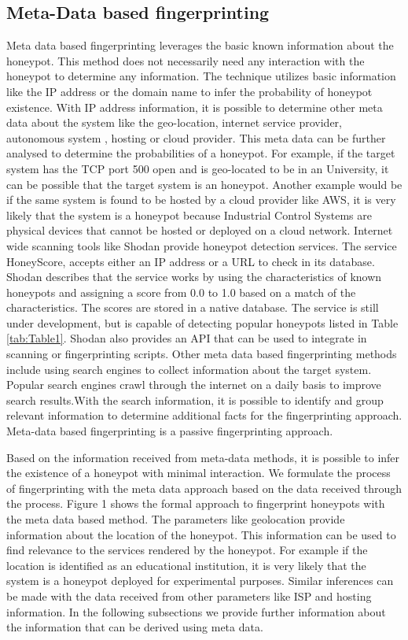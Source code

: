 \documentclass[letterpaper, 10 pt, conference]{ieeeconf}  %
\begin{document}
\subsection{Meta-Data based fingerprinting}
Meta data based fingerprinting leverages the basic known information about the honeypot. This method does not necessarily need any interaction with the honeypot to determine any information. The technique utilizes basic information like the IP address or the domain name to infer the probability of honeypot existence. With IP address information, it is possible to determine other meta data about the system like the geo-location, internet service provider, autonomous system , hosting or cloud provider. This meta data can be further analysed to determine the probabilities of a honeypot. For example, if the target system has the TCP port 500 open and is geo-located to be in an University, it can be possible that the target system is an honeypot. Another example would be if the same system is found to be hosted by a cloud provider like AWS, it is very likely that the system is a honeypot because Industrial Control Systems are physical devices that cannot be hosted or deployed on a cloud network.
Internet wide scanning tools like Shodan provide honeypot detection services. The service HoneyScore, accepts either an IP address or a URL to check in its database. Shodan describes that the service works by using the characteristics of known honeypots and assigning a score from 0.0 to 1.0 based on a match of the characteristics. The scores are stored in a native database. The service is still under development, but is capable of detecting popular honeypots listed in Table \ref{tab:Table1}. Shodan also provides an API that can be used to integrate in scanning or fingerprinting scripts. Other meta data based fingerprinting methods include using search engines to collect information about the target system. Popular search engines crawl through the internet on a daily basis to improve search results.With the search information, it is possible to identify and group relevant information to determine additional facts for the fingerprinting approach. Meta-data based fingerprinting is a passive fingerprinting approach.


Based on the information received from meta-data methods, it is possible to infer the existence of a honeypot with minimal interaction. We formulate the process of fingerprinting with the meta data approach based on the data received through the process. Figure 1 shows the formal approach to fingerprint honeypots with the meta data based method. The parameters like geolocation provide information about the location of the honeypot. This information can be used to find relevance to the services rendered by the honeypot. For example if the location is identified as an educational institution, it is very likely that the system is a honeypot deployed for experimental purposes. Similar inferences can be made with the data received from other parameters like ISP and hosting information. In the following subsections we provide further information about the information that can be derived using meta data. 
\end{document}
